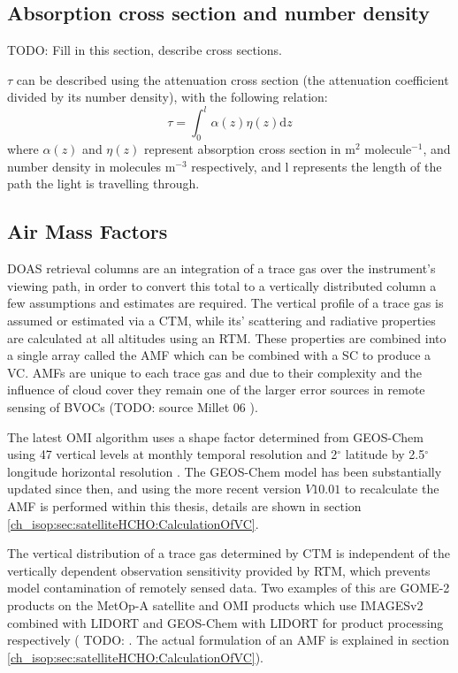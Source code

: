   \subsection{Absorption cross section and number density}
    \label{ch_isop:sec:satelliteHCHO:crosssection}
    TODO: Fill in this section, describe cross sections.
    
    
    $\tau$ can be described using the attenuation cross section (the attenuation coefficient divided by its number density), with the following relation:
    \begin{equation*}
      \tau = \int_0^l \alpha(z)\eta(z)\mathrm{d}z
    \end{equation*}
    where $\alpha(z)$ and $\eta(z)$ represent absorption cross section in m$^2$ molecule$^{-1}$, and number density in molecules m$^{-3}$ respectively, and l represents the length of the path the light is travelling through. 
  
  
  \subsection{Air Mass Factors}
    \label{ch_isop:sec:satelliteHCHO:AMFs}
    DOAS retrieval columns are an integration of a trace gas over the instrument's viewing path, in order to convert this total to a vertically distributed column a few assumptions and estimates are required. 
    The vertical profile of a trace gas is assumed or estimated via a CTM, while its' scattering and radiative properties are calculated at all altitudes using an RTM. 
    These properties are combined into a single array called the AMF which can be combined with a SC to produce a VC.
    AMFs are unique to each trace gas and due to their complexity and the influence of cloud cover they remain one of the larger error sources in remote sensing of BVOCs (TODO: source Millet 06 \citep{Palmer2001}).
    
    The latest OMI algorithm uses a shape factor determined from GEOS-Chem using 47 vertical levels at monthly temporal resolution and 2$^{\circ}$ latitude by 2.5$^{\circ}$ longitude horizontal resolution \citep{Gonzalez2015}.
    The GEOS-Chem model has been substantially updated since then, and using the more recent version $V10.01$ to recalculate the AMF is performed within this thesis, details are shown in section \ref{ch_isop:sec:satelliteHCHO:CalculationOfVC}.
    
    The vertical distribution of a trace gas determined by CTM is independent of the vertically dependent observation sensitivity provided by RTM, which prevents model contamination of remotely sensed data.
    Two examples of this are GOME-2 products on the MetOp-A satellite and OMI products which use IMAGESv2 combined with LIDORT and GEOS-Chem with LIDORT for product processing respectively ( TODO: %
    \citep{Gonzalez2015}.
    The actual formulation of an AMF is explained in section \ref{ch_isop:sec:satelliteHCHO:CalculationOfVC}).
  

